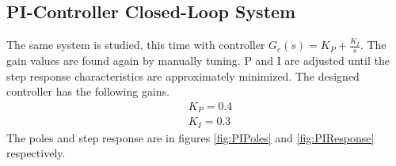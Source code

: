 \documentclass{article}
\begin{document}
    \subsection{PI-Controller Closed-Loop System}
    The same system is studied, this time with controller $G_c(s)=K_P+\frac{K_I}{s}$.
    The gain values are found again by manually tuning. 
    P and I are adjusted until the step response characteristics are approximately minimized.
    The designed controller has the following gains.
    \begin{equation}
        \begin{aligned}
            &K_P=0.4\\
            &K_I=0.3
        \end{aligned}
    \end{equation}
    The poles and step response are in figures \ref{fig:PIPoles} and \ref{fig:PIResponse} respectively.
\end{document}
